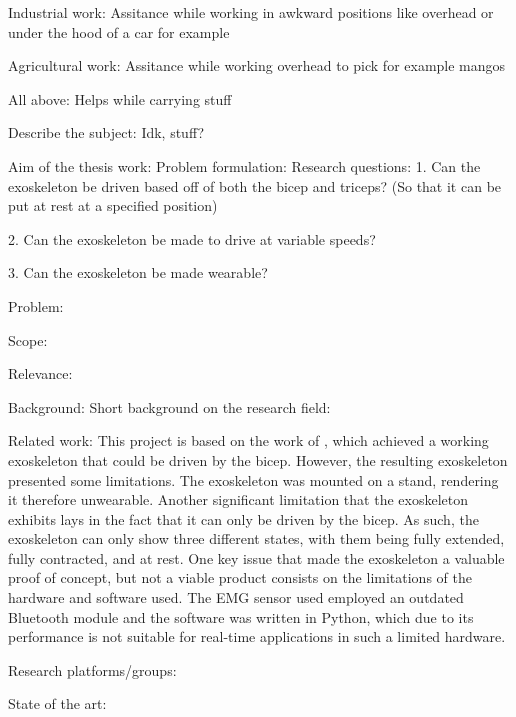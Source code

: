             Industrial work:
                Assitance while working in awkward positions like overhead or under the hood of a car for example

            Agricultural work:
                Assitance while working overhead to pick for example mangos
            
            All above:
                Helps while carrying stuff

    Describe the subject:
        Idk, stuff?

    Aim of the thesis work:
        Problem formulation: %
            Research questions:
                1.	Can the exoskeleton be driven based off of both the bicep and triceps? (So that it can be put at rest at a specified position)

                2.	Can the exoskeleton be made to drive at variable speeds?

                3.	Can the exoskeleton be made wearable?

            Problem:
                

            Scope:
            
            Relevance: %


Background: 
    Short background on the research field:

    Related work: %
        This project is based on the work of \cite{AFES}, which achieved a working exoskeleton that could be driven by the bicep. However, the resulting 
        exoskeleton presented some limitations. The exoskeleton was mounted on a stand, rendering it therefore unwearable. Another significant limitation 
        that the exoskeleton exhibits lays in the fact that it can only be driven by the bicep. As such, the exoskeleton can only show three different states, 
        with them being fully extended, fully contracted, and at rest. One key issue that made the exoskeleton a valuable proof of concept, but not a viable 
        product consists on the limitations of the hardware and software used. The EMG sensor used employed an outdated Bluetooth module and the software was 
        written in Python, which due to its performance is not suitable for real-time applications in such a limited hardware.

    Research platforms/groups:

    State of the art:


